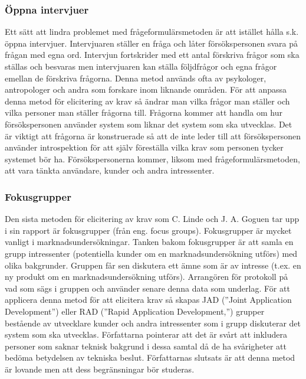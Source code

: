 \subsubsection{Öppna intervjuer} 
Ett sätt att lindra problemet med frågeformulärsmetoden är att istället hålla s.k. öppna intervjuer. Intervjuaren ställer en fråga och låter försökspersonen svara på frågan med egna ord. Intervjun fortskrider med ett antal förskriva frågor som ska ställas och besvaras men intervjuaren kan ställa följdfrågor och egna frågor emellan de förskriva frågorna. Denna metod används ofta av psykologer, antropologer och andra som forskare inom liknande områden. För att anpassa denna metod för elicitering av krav så ändrar man vilka frågor man ställer och vilka personer man ställer frågorna till. Frågorna kommer att handla om hur försökspersonen använder system som liknar det system som ska utvecklas. Det är viktigt att frågorna är konstruerade så att de inte leder till att försökspersonen använder introspektion för att själv föreställa vilka krav som personen tycker systemet bör ha. Försökspersonerna kommer, liksom med frågeformulärsmetoden, att vara tänkta användare, kunder och andra intressenter. 

\subsubsection{Fokusgrupper}
Den sista metoden för elicitering av krav som C. Linde och J. A. Goguen tar upp i sin rapport är fokusgrupper (från eng. focus groups). Fokusgrupper är mycket vanligt i marknadsundersökningar. Tanken bakom fokusgrupper är att samla en grupp intressenter (potentiella kunder om en marknadsundersökning utförs) med olika bakgrunder. Gruppen får sen diskutera ett ämne som är av intresse (t.ex. en ny produkt om en marknadsundersökning utförs). Arrangören för protokoll på vad som sägs i gruppen och använder senare denna data som underlag.  För att applicera denna metod för att elicitera krav så skapas JAD (”Joint Application Development”) eller RAD (”Rapid Application Development,”) grupper bestående av utvecklare kunder och andra intressenter som i grupp diskuterar det system som ska utvecklas. Författarna pointerar att det är svårt att inkludera personer som saknar teknisk bakgrund i dessa samtal då de ha svårigheter att bedöma betydelsen av tekniska beslut. Författarnas slutsats är att denna metod är lovande men att dess begränsningar bör studeras. 

 

